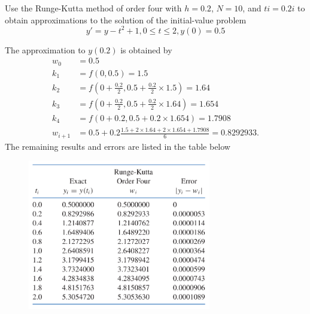 \begin{ex}
	Use the Runge-Kutta method of order four with $h = 0.2$, $N = 10$, and $ti = 0.2i$ to obtain approximations to the solution of the initial-value problem
	\[ y' = y - t^2 + 1, 0 \leq t \leq 2, y(0) = 0.5 \]
	
	\begin{solution}
		The approximation to $y(0.2)$ is obtained by
		\begin{align*}
		w_0 &= 0.5\\
		k_1 &= f(0, 0.5) = 1.5\\
		k_2 &= f\left(0 + \frac{0.2}{2}, 0.5 + \frac{0.2}{2}\times 1.5\right) =1.64\\
		k_3 &= f\left(0 + \frac{0.2}{2}, 0.5 + \frac{0.2}{2}\times 1.64\right) =1.654\\
		k_4 &= f\left(0 + 0.2, 0.5 + 0.2\times 1.654\right) = 1.7908\\
		w_{i+1} &= 0.5 + 0.2\frac{1.5 + 2\times 1.64 + 2\times 1.654 + 1.7908}{6} =0.8292933.
		\end{align*}
		The remaining results and errors are listed in the table below
		\begin{figure} [H]
			\includegraphics*[width=8cm]{img/chapter8table3.PNG}
		\end{figure}
	\end{solution}
\end{ex}


